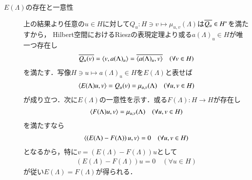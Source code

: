 \begin{prf}
\begin{description}
\begin{description}
					\item[$E(\Lambda)$の存在と一意性]
						上の結果より任意の$u \in H$に対して$Q_u:H \ni v \longmapsto \mu_{u,v}(\Lambda)$は$\overline{Q_u} \in H^*$を満たすから，
						Hilbert空間におけるRieszの表現定理より或る$a(\Lambda)_u \in H$が唯一つ存在し
						\begin{align}
							\conj{Q_u(v)} = \inprod<v,a(\Lambda)_u> = \conj{\inprod<a(\Lambda)_u,v>} \quad (\forall v \in H)
						\end{align}
						を満たす．写像$H \ni u \longmapsto a(\Lambda)_u \in H$を$E(\Lambda)$と表せば
						\begin{align}
							\inprod<E(\Lambda)u,v> = Q_u(v) = \mu_{u,v}(\Lambda) \quad (\forall u,v \in H)
						\end{align}
						が成り立つ．次に$E(\Lambda)$の一意性を示す．或る$F(\Lambda):H \rightarrow H$が存在し
						\begin{align}
							\inprod<F(\Lambda)u,v> = \mu_{u,v}(\Lambda) \quad (\forall u,v \in H)
						\end{align}
						を満たすなら
						\begin{align}
							\inprod<\left( E(\Lambda) - F(\Lambda) \right)u,v> = 0
							\quad (\forall u,v \in H)
						\end{align}
						となるから，特に$v = \left( E(\Lambda) - F(\Lambda) \right)u$として
						\begin{align}
							\left( E(\Lambda) - F(\Lambda) \right)u = 0 \quad (\forall u \in H)
						\end{align}
						が従い$E(\Lambda) = F(\Lambda)$が得られる．
						

\end{description}
\end{description}
\end{prf}
